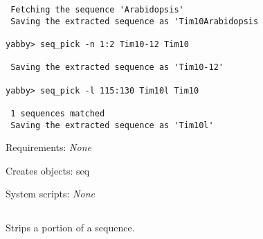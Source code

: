 \begin{description}
\begin{enumerate}
\begin{verbatim}
 Fetching the sequence 'Arabidopsis'
 Saving the extracted sequence as 'Tim10Arabidopsis

yabby> seq_pick -n 1:2 Tim10-12 Tim10

 Saving the extracted sequence as 'Tim10-12'

yabby> seq_pick -l 115:130 Tim10l Tim10

 1 sequences matched
 Saving the extracted sequence as 'Tim10l'

\end{verbatim}

\end{enumerate}


\item{Requirements:} {\em None}


\item{Creates objects:} seq


\item{System scripts:} {\em None}

\end{description}



\subsection[seq\_strip]{  }



Strips a portion of a sequence.


